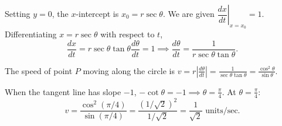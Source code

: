 \documentclass[a4paper, 12pt]{article}
\begin{document}
\begin{enumerate}[leftmargin=*,label=\textbf{\arabic*.}]
Setting $y = 0$, the $x$-intercept is $x_0 = r \sec \theta$. We are given $\left.\dfrac{dx}{dt}\right|_{x=x_0} = 1$. Differentiating $x = r \sec \theta$ with respect to $t$,
\[\frac{dx}{dt} = r \sec \theta \tan \theta \frac{d\theta}{dt} = 1 \implies \frac{d\theta}{dt} = \frac{1}{r \sec \theta \tan \theta}.\]

The speed of point $P$ moving along the circle is $v = r \left|\frac{d\theta}{dt}\right| = \frac{1}{\sec \theta \tan \theta} = \frac{\cos^2 \theta}{\sin \theta}$.

When the tangent line has slope $-1$, $-\cot \theta = -1 \implies \theta = \frac{\pi}{4}$. At $\theta = \frac{\pi}{4}$:
\[v = \frac{\cos^2(\pi/4)}{\sin(\pi/4)} = \frac{(1/\sqrt{2})^2}{1/\sqrt{2}} = \boxed{\frac{1}{\sqrt{2}} \text{ units/sec}}.\]
\end{enumerate}
\end{document}
